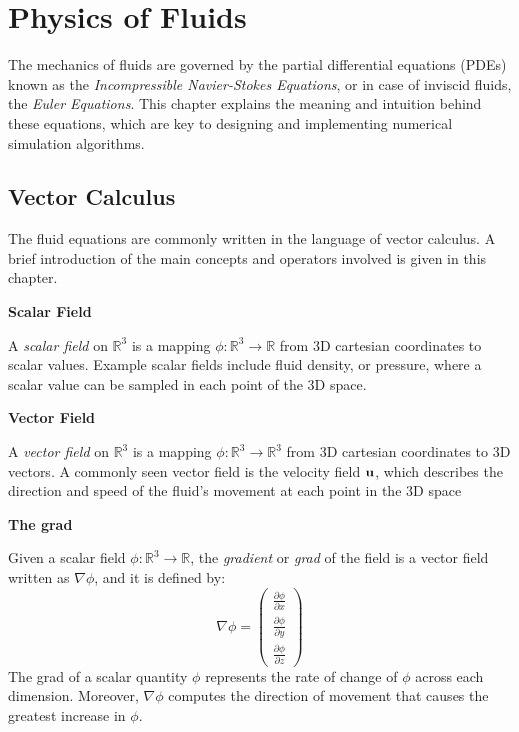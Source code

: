 \chapter{Physics of Fluids}
\label{chapter physics}

The mechanics of fluids are governed by the partial differential equations (PDEs) known as the \textit{Incompressible Navier-Stokes Equations}, or in case of inviscid fluids, the \textit{Euler Equations}. This chapter explains the meaning and intuition behind these equations, which are key to designing and implementing numerical simulation algorithms.

\section{Vector Calculus}
The fluid equations are commonly written in the language of vector calculus. A brief introduction of the main concepts and operators involved is given in this chapter. 


\gapM

\textbf{Scalar Field}

\gapS

A \textit{scalar field} on $ \mathbb{R} ^3 $ is a mapping $\phi : \mathbb{R} ^3 \rightarrow \mathbb{R} $ from 3D cartesian coordinates to scalar values. Example scalar fields include fluid density, or pressure, where a scalar value can be sampled in each point of the 3D space.

\gapM

\textbf{Vector Field}

\gapS

A \textit{vector field} on $ \mathbb{R} ^3 $ is a mapping $\phi : \mathbb{R} ^3 \rightarrow \mathbb{R} ^3 $ from 3D cartesian coordinates to 3D vectors. A commonly seen vector field is the velocity field $\textbf{u}$, which describes the direction and speed of the fluid's movement at each point in the 3D space


\gapM

\textbf{The grad}

\gapS

Given a scalar field $\phi : \mathbb{R} ^3 \rightarrow \mathbb{R} $, the \textit{gradient} or \textit{grad} of the field is a vector field written as $\nabla \phi$, and it is defined by:
\begin{equation*}
    \nabla \phi = 
    \left(
    \begin{aligned}
        \frac{\partial \phi}{\partial x} \\
        \frac{\partial \phi}{\partial y} \\
        \frac{\partial \phi}{\partial z}
    \end{aligned} \right)
\end{equation*} 
The grad of a scalar quantity $\phi$ represents the rate of change of $\phi$ across each dimension. Moreover, $\nabla \phi$ computes the direction of movement that causes the greatest increase in $\phi$. 

